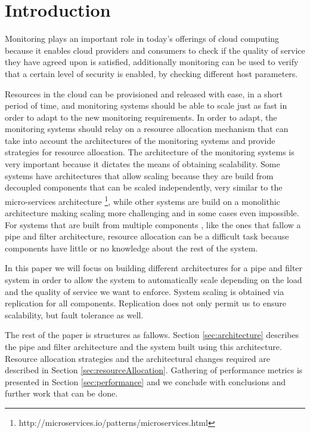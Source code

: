 \section*{Introduction}

Monitoring plays an important role in today's offerings of cloud computing because it enables cloud providers and consumers to check if the quality of service they have agreed upon is satisfied, additionally monitoring can be used to verify that a certain level of security is enabled, by checking different host parameters.

Resources in the cloud can be provisioned and released with ease, in a short period of time, and monitoring systems should be able to scale just as fast in order to adapt to the new monitoring requirements. In order to adapt, the monitoring systems should relay on a resource allocation mechanism that can take into account the architectures of the monitoring systems and provide strategies for resource allocation. The architecture of the monitoring systems is very important because it dictates the means of obtaining scalability. Some systems have architectures that allow scaling because they are build from decoupled components that can be scaled independently, very similar to the micro-services architecture \footnote{http://microservices.io/patterns/microservices.html}, while other systems are build on a monolithic architecture making scaling more challenging and in some cases even impossible. For systems that are built from multiple components , like the ones that fallow a pipe and filter architecture, resource allocation can be a difficult task because components have little or no knowledge about the rest of the system.


In this paper we will focus on building different architectures for a pipe and filter system in order to allow the system to automatically scale depending on the load and the quality of service we want to enforce. System scaling is obtained via replication for all components. Replication does not only permit us to ensure scalability, but fault tolerance as well.

The rest of the paper is structures as fallows. Section \ref{sec:architecture} describes the pipe and filter architecture and the system built using this architecture. Resource allocation strategies and the architectural changes required are described in Section \ref{sec:resourceAllocation}. Gathering of performance metrics is presented in Section \ref{sec:performance} and we conclude with conclusions and further work that can be done.
